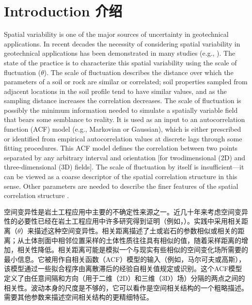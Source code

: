 \section*{Introduction 介绍}

\begin{ParaColumn}
    Spatial variability is one of the major sources of uncertainty in geotechnical applications. In recent decades the necessity of considering spatial variability in geotechnical applications has been demonstrated in many studies (e.g., \citet{Griffiths1993577,Griffiths20091367,Cho2010975,Soubra2010275,Hicks2010948,Huang2010343,Stuedlein20121314,Cassidy2013191,Jha2013708,Javankhoshdel20141033,Jiang2014120,Le2014250,Li201560,Javankhoshdel2016,Xiao2016146,Li2016146,Luo201645,Javankhoshdel2017231,Papaioannou2017116}). The state of the practice is to characterize this spatial variability using the scale of fluctuation ($\theta$). The scale of fluctuation describes the distance over which the parameters of a soil or rock are similar or correlated; soil properties sampled from adjacent locations in the soil profile tend to have similar values, and as the sampling distance increases the correlation decreases. The scale of fluctuation is possibly the minimum information needed to simulate a spatially variable field that bears some semblance to reality. It is used as an input to an autocorrelation function (ACF) model (e.g., Markovian or Gaussian), which is either prescribed or identified from empirical autocorrelation values at discrete lags through some fitting procedures. This ACF model defines the correlation between two points separated by any arbitrary interval and orientation [for twodimensional (2D) and three-dimensional (3D) fields]. The scale of fluctuation by itself is insufficient—it can be viewed as a coarse descriptor of the spatial correlation structure in this sense. Other parameters are needed to describe the finer features of the spatial correlation structure \citep{Ching2019145}.

    \switchcolumn

    空间变异性是岩土工程应用中主要的不确定性来源之一。近几十年来考虑空间变异性的必要性已经在岩土工程应用中许多研究得到证明（例如，\citet{Griffiths1993577,Griffiths20091367,Cho2010975,Soubra2010275,Hicks2010948,Huang2010343,Stuedlein20121314,Cassidy2013191,Jha2013708,Javankhoshdel20141033,Jiang2014120,Le2014250,Li201560,Javankhoshdel2016,Xiao2016146,Li2016146,Luo201645,Javankhoshdel2017231,Papaioannou2017116}）。实践中采用相关距离（$\theta$）来描述这种空间变异性。相关距离描述了土或岩石的参数相似或相关的距离；从土体剖面中相邻位置采样的土体性质往往具有相似的值，随着采样距离的增加，相关性降低。相关距离可能是模拟一个与现实有些相似的空间变化场所需要的最小信息。它被用作自相关函数（ACF）模型的输入（例如，马尔可夫或高斯），该模型通过一些拟合程序由离散滞后的经验自相关值规定或识别。这个ACF模型定义了由任意间隔和方向（用于二维（2D）和三维（3D）场）分隔的两点之间的相关性。波动本身的尺度是不够的，它可以看作是空间相关结构的一个粗略描述。需要其他参数来描述空间相关结构的更精细特征\citep{Ching2019145}。


\end{ParaColumn}
